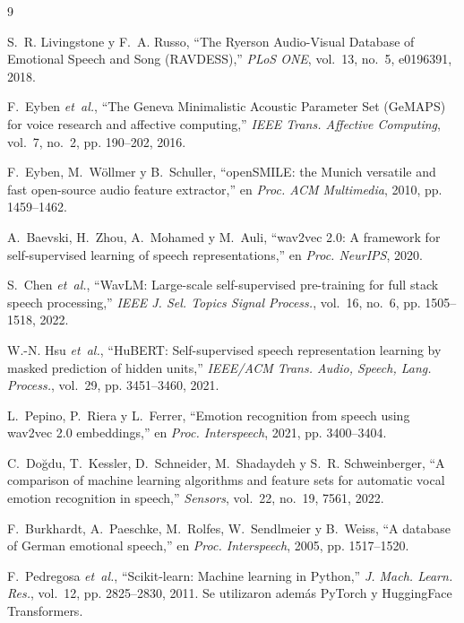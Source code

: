 \documentclass[conference]{IEEEtran}
\begin{document}

\begin{thebibliography}{9}

S.~R. Livingstone y F.~A. Russo, ``The Ryerson Audio-Visual Database of
Emotional Speech and Song (RAVDESS),'' \emph{PLoS ONE}, vol.~13, no.~5,
e0196391, 2018.

F.~Eyben \emph{et~al.}, ``The Geneva Minimalistic Acoustic Parameter Set
(GeMAPS) for voice research and affective computing,'' \emph{IEEE Trans.
Affective Computing}, vol.~7, no.~2, pp. 190--202, 2016.

F.~Eyben, M.~Wöllmer y B.~Schuller, ``openSMILE: the Munich versatile and
fast open-source audio feature extractor,'' en \emph{Proc. ACM Multimedia},
2010, pp. 1459--1462.

A.~Baevski, H.~Zhou, A.~Mohamed y M.~Auli, ``wav2vec 2.0: A framework for
self-supervised learning of speech representations,'' en \emph{Proc.
NeurIPS}, 2020.

S.~Chen \emph{et~al.}, ``WavLM: Large-scale self-supervised pre-training for
full stack speech processing,'' \emph{IEEE J. Sel. Topics Signal Process.},
vol.~16, no.~6, pp. 1505--1518, 2022.

W.-N. Hsu \emph{et~al.}, ``HuBERT: Self-supervised speech representation
learning by masked prediction of hidden units,'' \emph{IEEE/ACM Trans. Audio,
Speech, Lang. Process.}, vol.~29, pp. 3451--3460, 2021.

L.~Pepino, P.~Riera y L.~Ferrer, ``Emotion recognition from speech using
wav2vec 2.0 embeddings,'' en \emph{Proc. Interspeech}, 2021, pp. 3400--3404.

C.~Doğdu, T.~Kessler, D.~Schneider, M.~Shadaydeh y S.~R. Schweinberger, ``A
comparison of machine learning algorithms and feature sets for automatic
vocal emotion recognition in speech,'' \emph{Sensors}, vol.~22, no.~19,
7561, 2022.

F.~Burkhardt, A.~Paeschke, M.~Rolfes, W.~Sendlmeier y B.~Weiss, ``A database
of German emotional speech,'' en \emph{Proc. Interspeech}, 2005, pp.
1517--1520.

F.~Pedregosa \emph{et~al.}, ``Scikit-learn: Machine learning in Python,''
\emph{J. Mach. Learn. Res.}, vol.~12, pp. 2825--2830, 2011. Se utilizaron
además PyTorch y HuggingFace Transformers.

\end{thebibliography}
\end{document}
